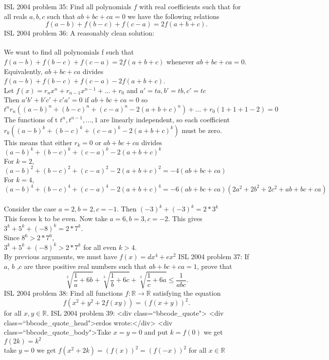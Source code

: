 ISL 2004 problem 35:  Find all polynomials $f$ with real coefficients such that for all reals $a,b,c$ such that $ab+bc+ca = 0$ we have the following relations
\[ f(a-b) + f(b-c) + f(c-a) = 2f(a+b+c). \] 
ISL 2004 problem 36:  A reasonably clean solution: \\\\
We want to find all polynomials f such that $f(a-b)+f(b-c)+f(c-a)=2f(a+b+c)$ whenever $ab+bc+ca=0$. Equivalently, $ab+bc+ca$ divides $f(a-b)+f(b-c)+f(c-a)-2f(a+b+c)$. \\
Let $f(x)=r_nx^n+r_{n-1}x^{n-1}+...+r_0$ and $a'=ta,b'=tb,c'=tc$ \\
Then $a'b'+b'c'+c'a'=0$ if $ab+bc+ca=0$ so $t^nr_n((a-b)^n+(b-c)^n+(c-a)^n-2(a+b+c)^n)+...+r_0(1+1+1-2)=0$ \\
The functions of t $t^n,t^{n-1},...,1$ are linearly independent, so each coefficient $r_k((a-b)^k+(b-c)^k+(c-a)^k-2(a+b+c)^k)$ must be zero. \\
This means that either $r_k=0$ or $ab+bc+ca$ divides $(a-b)^k+(b-c)^k+(c-a)^k-2(a+b+c)^k$ \\
For $k=2$, $(a-b)^2+(b-c)^2+(c-a)^2-2(a+b+c)^2=-4(ab+bc+ca)$ \\
For $k=4$, $(a-b)^4+(b-c)^4+(c-a)^4-2(a+b+c)^4=
-6(ab+bc+ca)(2a^2+2b^2+2c^2+ab+bc+ca)$ \\\\
Consider the case $a=2,b=2,c=-1$. Then $(-3)^k+(-3)^k=2*3^k$ \\
This forces k to be even. Now take $a=6,b=3,c=-2$. This gives \\
$3^k+5^k+(-8)^k=2*7^k$. \\
Since $8^6>2*7^6$, \\
$3^k+5^k+(-8)^k>2*7^k$ for all even $k>4$. \\
By previous arguments, we must have $f(x)=dx^4+ex^2$ 
ISL 2004 problem 37:  If $a$, $b$ ,$c$ are three positive real numbers such that $ab+bc+ca = 1$, prove that
\[
\sqrt[3]{ \frac{1}{a} + 6b} + \sqrt[3]{\frac{1}{b} + 6c} + \sqrt[3]{\frac{1}{c} + 6a } \leq \frac{1}{abc}.
\] 
ISL 2004 problem 38:  Find all functions $f:\mathbb{R} \to \mathbb{R}$ satisfying the equation
\[ f(x^2+y^2+2f(xy)) = (f(x+y))^2. \]
for all $x,y \in \mathbb{R}$. 
ISL 2004 problem 39:  <div class=``bbcode_quote">
<div class=``bbcode_quote_head">erdos wrote:</div>
<div class=``bbcode_quote_body">Take $x=y=0$ and put $k=f(0)$ we get $f(2k)=k^2$ \\
take $y=0$ we get $f(x^2+2k)=(f(x))^2=(f(-x))^2$ for all $x \in \mathbb R$ \\

